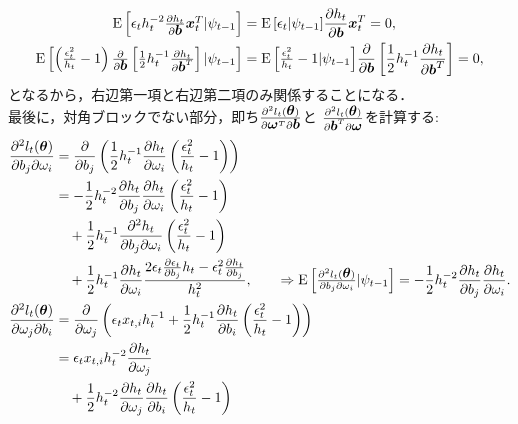 \documentclass[8pt]{jsarticle}
\def\vector#1{\mbox{\boldmath $#1$}}
\def\Exp#1{\mbox{${\rm E} \left[ #1 \right]$}}
\begin{document}
\begin{breakbox}
\begin{align*}
		\Exp{\epsilon_t h_t^{-2} \frac{\partial h_t}{\partial \vector{b}} \vector{x}_t^{T} | \psi_{t-1}} &= \Exp{\epsilon_t | \psi_{t-1}}\frac{\partial h_t}{\partial \vector{b}} \vector{x}_t^{T} = 0, \\
		\Exp{ \left( \frac{\epsilon_t^2}{h_t} - 1 \right) \frac{\partial}{\partial \vector{b}}\left[ \frac{1}{2} h_t^{-1} \frac{\partial h_t}{\partial \vector{b}^{T}} \right] | \psi_{t-1}}
			&= \Exp{\frac{\epsilon_t^2}{h_t} - 1 | \psi_{t-1}}\frac{\partial}{\partial \vector{b}}\left[ \frac{1}{2} h_t^{-1} \frac{\partial h_t}{\partial \vector{b}^{T}} \right] = 0,
	\end{align*}
	となるから，右辺第一項と右辺第二項のみ関係することになる． \\
	最後に，対角ブロックでない部分，即ち$\frac{\partial^2 l_t(\vector{\theta})}{\partial \vector{\omega}^{T} \partial \vector{b}}$と
	$\frac{\partial^2 l_t(\vector{\theta})}{\partial \vector{b}^{T} \partial \vector{\omega}}$を計算する:
	\begin{align*}
		\frac{\partial^2 l_t(\vector{\theta})}{\partial b_j \partial \omega_i} 
			&= \frac{\partial}{\partial b_j}\left( \frac{1}{2} h_t^{-1} \frac{\partial h_t}{\partial \omega_i} \left( \frac{\epsilon_t^2}{h_t} - 1 \right) \right) \\
			&= -\frac{1}{2}h_t^{-2}\frac{\partial h_t}{\partial b_j}\frac{\partial h_t}{\partial \omega_i}\left( \frac{\epsilon_t^2}{h_t} - 1 \right) \\
				&\quad+ \frac{1}{2}h_t^{-1}\frac{\partial^2 h_t}{\partial b_j \partial \omega_i} \left( \frac{\epsilon_t^2}{h_t} - 1 \right) \\
				&\quad+ \frac{1}{2}h_t^{-1} \frac{\partial h_t}{\partial \omega_i} \frac{2\epsilon_t \frac{\partial \epsilon_t}{\partial b_j} h_t - \epsilon_t^2 \frac{\partial h_t}{\partial b_j}}{h_t^2},
			\hspace{20pt} \Rightarrow \Exp{\frac{\partial^2 l_t(\vector{\theta})}{\partial b_j \partial \omega_i} | \psi_{t-1}} =  -\frac{1}{2}h_t^{-2}\frac{\partial h_t}{\partial b_j}\frac{\partial h_t}{\partial \omega_i}. \\
		\frac{\partial^2 l_t(\vector{\theta})}{\partial \omega_j \partial b_i}
			&= \frac{\partial}{\partial \omega_j}\left( \epsilon_t x_{t,i} h_t^{-1} + \frac{1}{2} h_t^{-1} \frac{\partial h_t}{\partial b_i} \left( \frac{\epsilon_t^2}{h_t} - 1 \right) \right) \\
			&= \epsilon_t x_{t,i} h_t^{-2} \frac{\partial h_t}{\partial \omega_j} \\
				&\quad+ \frac{1}{2} h_t^{-2} \frac{\partial h_t}{\partial \omega_j} \frac{\partial h_t}{\partial b_i}  \left( \frac{\epsilon_t^2}{h_t} - 1 \right) \\

\end{align*}
\end{breakbox}
\end{document}
